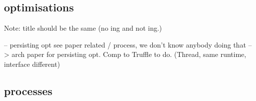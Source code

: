 \documentclass[a4paper,12pt,twoside]{../includes/ThesisStyle}
\begin{document}
\subsection{optimisations}
Note: title should be the same (no ing and not ing.)

-- persisting opt see paper related / process, we don't know anybody doing that
--> arch paper for persisting opt. Comp to Truffle to do. (Thread, same runtime, interface different)

\subsection{processes}

\ifx\wholebook\relax\else
    
\end{document}
